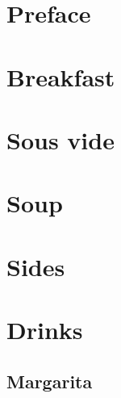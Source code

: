 \dominitoc  %
\nomtcrule  %

\tableofcontents


\chapter*{Preface}
\enlargethispage{5\baselineskip}  %


\clearpage

\mainmatter

\setcounter{mtc}{0}  %
\mtcaddchapter       %
\chapter{Breakfast}
\minitoc
\clearpage




\chapter{Sous vide}
\minitoc
\clearpage




\chapter{Soup}
\minitoc
\clearpage





\chapter{Sides}
\minitoc
\clearpage



\chapter{Drinks}
\minitoc
\clearpage


\section{Margarita}
{
	\let\section\subsection
	\let\subsection\subsubsection
	
	
}

